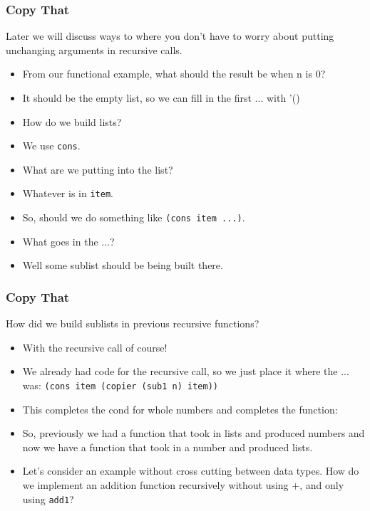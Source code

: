 \documentclass{beamer}
\begin{document}
\begin{frame}
  \frametitle{Copy That}
  Later we will discuss ways to where you don't have to worry about putting unchanging arguments in recursive calls.
  \begin{itemize}
  \item<2-> From our functional example, what should the result be
    when n is 0?
  \item<3-> It should be the empty list, so we can  fill in the first ... with '()
  \item<4-> How do we build lists?
  \item<5-> We use \texttt{cons}.
  \item<6-> What are we putting into the list?
  \item<7-> Whatever is in \texttt{item}.
  \item<8-> So, should we do something like
    \texttt{(cons item ...)}.
  \item<9-> What goes in the ...?
  \item<10-> Well some sublist should be being built there.
  \end{itemize}
\end{frame}


\begin{frame}
  \frametitle{Copy That}
  How did we build sublists in previous recursive functions?
  \begin{itemize}
  \item<2-> With the recursive call of course!
  \item<3-> We already had code for the recursive call, so we just
    place it where the ... was:
    \texttt{(cons item (copier (sub1 n) item))}
  \item<4-> This completes the cond for whole numbers and completes
    the function:
    \CopierFinal
  \item<5-> So, previously we had a function that took in lists and
    produced numbers and now we have a function that took in a number and produced lists.
  \item<6-> Let's consider an example without cross cutting between data types. How do we implement an addition function recursively without using +, and only using \texttt{add1}?
  \end{itemize}
\end{frame}
\end{document}
